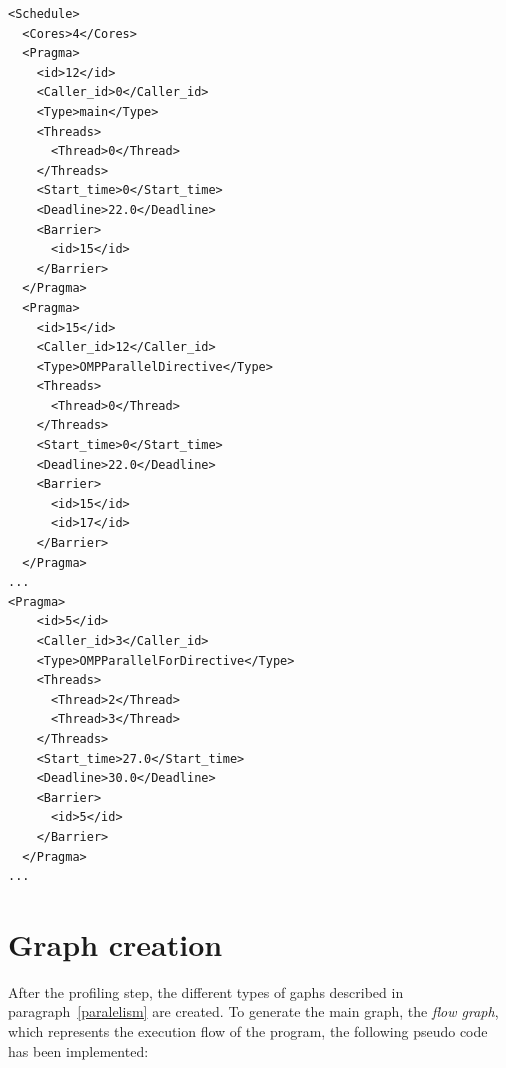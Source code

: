\documentclass[a4paper,11pt,oneside]{book}
\begin{document}
\lstset{language=XML}
\begin{lstlisting}[caption=Schedule XML, label=schedule]
<Schedule>
  <Cores>4</Cores>
  <Pragma>
    <id>12</id>
    <Caller_id>0</Caller_id>
    <Type>main</Type>
    <Threads>
      <Thread>0</Thread>
    </Threads>
    <Start_time>0</Start_time>
    <Deadline>22.0</Deadline>
    <Barrier>
      <id>15</id>
    </Barrier>
  </Pragma>
  <Pragma>
    <id>15</id>
    <Caller_id>12</Caller_id>
    <Type>OMPParallelDirective</Type>
    <Threads>
      <Thread>0</Thread>
    </Threads>
    <Start_time>0</Start_time>
    <Deadline>22.0</Deadline>
    <Barrier>
      <id>15</id>
      <id>17</id>
    </Barrier>
  </Pragma>
...
<Pragma>
    <id>5</id>
    <Caller_id>3</Caller_id>
    <Type>OMPParallelForDirective</Type>
    <Threads>
      <Thread>2</Thread>
      <Thread>3</Thread>
    </Threads>
    <Start_time>27.0</Start_time>
    <Deadline>30.0</Deadline>
    <Barrier>
      <id>5</id>
    </Barrier>
  </Pragma>
...

\end{lstlisting}

\section{Graph creation}
\label{graph}

After the profiling step, the different types of gaphs described in paragraph~\ref{paralelism} are created. To generate the main graph, the \emph{flow graph}, which represents the execution flow of the program, the following pseudo code has been implemented:
\end{document}
